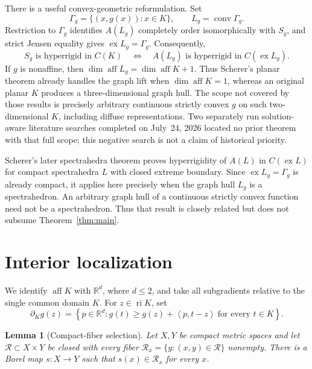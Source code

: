 \documentclass[11pt,a4paper]{amsart}
\newtheorem{lemma}[theorem]{Lemma}
\theoremstyle{remark}
\newcommand{\aff}{\operatorname{aff}}
\newcommand{\ri}{\operatorname{ri}}
\newcommand{\ex}{\operatorname{ex}}
\newcommand{\inner}[2]{\left\langle #1,#2\right\rangle}
\begin{document}
There is a useful convex-geometric reformulation.  Set
\[
 \Gamma_g=\{(x,g(x)):x\in K\},\qquad
 L_g=\operatorname{conv}\Gamma_g.
\]
Restriction to \(\Gamma_g\) identifies \(A(L_g)\) completely order
isomorphically with \(S_g\), and strict Jensen equality gives
\(\ex L_g=\Gamma_g\).  Consequently,
\[
 S_g\text{ is hyperrigid in }C(K)
 \quad\Longleftrightarrow\quad
 A(L_g)\text{ is hyperrigid in }C(\ex L_g).
\]
If \(g\) is nonaffine, then
\(\dim\aff L_g=\dim\aff K+1\).  Thus Scherer's planar theorem already handles
the graph lift when \(\dim\aff K=1\), whereas an original planar \(K\)
produces a three-dimensional graph hull.  The scope not covered by those
results is precisely arbitrary continuous strictly convex \(g\) on such
two-dimensional \(K\), including diffuse representations.  Two separately
run solution-aware literature searches completed on July~24, 2026 located no
prior theorem with that full scope; this negative search is not a claim of
historical priority.

Scherer's later spectrahedra theorem \cite{SchererSpectrahedra} proves
hyperrigidity of \(A(L)\) in \(C(\ex L)\) for compact spectrahedra \(L\)
with closed extreme boundary.  Since \(\ex L_g=\Gamma_g\) is already compact,
it applies here precisely when the graph hull \(L_g\) is a spectrahedron.
An arbitrary graph hull of a continuous strictly convex function need not be
a spectrahedron.  Thus that result is closely related but does not subsume
Theorem~\ref{thm:main}.

\section{Interior localization}

We identify \(\aff K\) with \(\mathbb R^d\), where \(d\leq2\), and take all
subgradients relative to the single common domain \(K\).  For
\(z\in\ri K\), set
\[
 \partial_Kg(z)=
 \left\{p\in\mathbb R^d:
 g(t)\geq g(z)+\inner{p}{t-z}\ \text{for every }t\in K\right\}.
\]

\begin{lemma}[Compact-fiber selection]\label{lem:borel-selection}
Let \(X,Y\) be compact metric spaces and let
\(\mathcal R\subset X\times Y\) be closed with every fiber
\(\mathcal R_x=\{y:(x,y)\in\mathcal R\}\) nonempty.  There is a Borel map
\(s\colon X\to Y\) such that \(s(x)\in\mathcal R_x\) for every \(x\).
\end{lemma}
\end{document}
